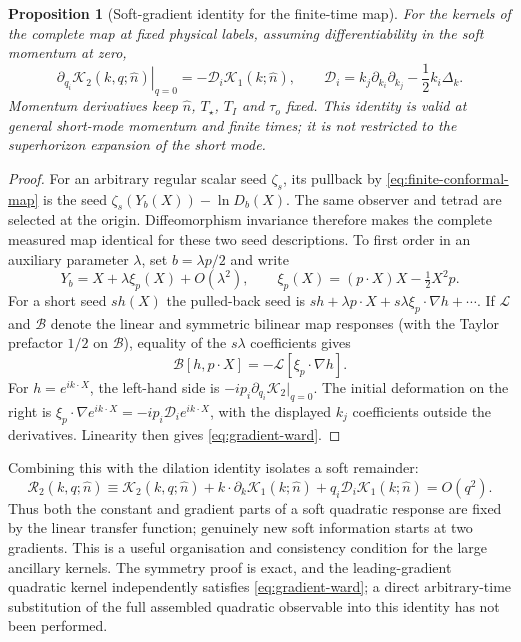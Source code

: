 \documentclass[11pt]{article}
\newtheorem{proposition}[theorem]{Proposition}
\theoremstyle{definition}
\theoremstyle{remark}
\newcommand{\nh}{\hat n}
\begin{document}
\begin{proposition}[Soft-gradient identity for the finite-time map]\label{prop:gradient-ward}
For the kernels of the complete map at fixed physical labels, assuming differentiability
in the soft momentum at zero,
\begin{equation}\label{eq:gradient-ward}
\boxed{\displaystyle
\left.\partial_{q_i}\mathcal K_2(k,q;\nh)\right|_{q=0}
=-\mathcal D_i\mathcal K_1(k;\nh),\qquad
\mathcal D_i=k_j\partial_{k_i}\partial_{k_j}
-\frac12k_i\Delta_k.}
\end{equation}
Momentum derivatives keep $\nh$, $T_\star$, $T_I$ and $\tau_o$ fixed. This identity is valid
at general short-mode momentum and finite times; it is not restricted to the
superhorizon expansion of the short mode.
\end{proposition}
\begin{proof}
For an arbitrary regular scalar seed $\zeta_s$, its pullback by \eqref{eq:finite-conformal-map}
is the seed $\zeta_s(Y_b(X))-\ln D_b(X)$. The same observer and tetrad are selected at the
origin. Diffeomorphism invariance therefore makes the complete measured map identical for
these two seed descriptions. To first order in an auxiliary parameter $\lambda$, set
$b=\lambda p/2$ and write
\[
Y_b=X+\lambda\xi_p(X)+O(\lambda^2),\qquad
\xi_p(X)=(p\cdot X)X-\tfrac12X^2p.
\]
For a short seed $s h(X)$ the pulled-back seed is
$s h+\lambda p\cdot X+s\lambda\xi_p\cdot\nabla h+\cdots$.
If $\mathcal L$ and $\mathcal B$ denote the linear and symmetric bilinear map responses
(with the Taylor prefactor $1/2$ on $\mathcal B$), equality of the $s\lambda$ coefficients
gives
\[
\mathcal B[h,p\cdot X]=-\mathcal L[\xi_p\cdot\nabla h].
\]
For $h=e^{ik\cdot X}$, the left-hand side is
$-ip_i\partial_{q_i}\mathcal K_2|_{q=0}$. The initial deformation on the right is
$\xi_p\cdot\nabla e^{ik\cdot X}=-ip_i\mathcal D_i e^{ik\cdot X}$, with the displayed
$k_j$ coefficients outside the derivatives. Linearity then gives \eqref{eq:gradient-ward}.
\end{proof}

Combining this with the dilation identity isolates a soft remainder:
\begin{equation}\label{eq:soft-remainder}
\mathcal R_2(k,q;\nh)\equiv\mathcal K_2(k,q;\nh)
+k\cdot\partial_k\mathcal K_1(k;\nh)
+q_i\mathcal D_i\mathcal K_1(k;\nh)=O(q^2).
\end{equation}
Thus both the constant and gradient parts of a soft quadratic response are fixed by the
linear transfer function; genuinely new soft information starts at two gradients. This is
a useful organisation and consistency condition for the large ancillary kernels. The
symmetry proof is exact, and the leading-gradient quadratic kernel independently satisfies
\eqref{eq:gradient-ward}; a direct arbitrary-time substitution of the full assembled
quadratic observable into this identity has not been performed.
\end{document}
